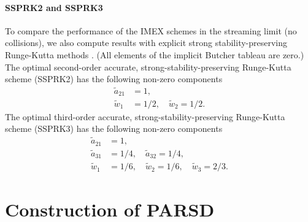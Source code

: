 \paragraph{SSPRK2 and SSPRK3}

To compare the performance of the IMEX schemes in the streaming limit (no collisions), we also compute results with explicit strong stability-preserving Runge-Kutta methods \cite{gottlieb_etal_2001}.  
(All elements of the implicit Butcher tableau are zero.)  
The optimal second-order accurate, strong-stability-preserving Runge-Kutta scheme (SSPRK2) has the following non-zero components
\begin{align}
  \tilde{a}_{21} &= 1, \nonumber \\ 
  \tilde{w}_{1}  &= 1/2, \quad \tilde{w}_{2} = 1/2. \nonumber 
\end{align}
The optimal third-order accurate, strong-stability-preserving Runge-Kutta scheme (SSPRK3) has the following non-zero components
\begin{align}
  \tilde{a}_{21} &= 1, \nonumber \\
  \tilde{a}_{31} &= 1/4, \quad \tilde{a}_{32} = 1/4, \nonumber \\
  \tilde{w}_{1} &= 1/6, \quad \tilde{w}_{2} = 1/6, \quad \tilde{w}_{3} =2/3. \nonumber
\end{align}

\newpage 
\section{Construction of PARSD}
\label{app:PARSD}

